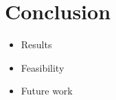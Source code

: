 \chapter{Conclusion} 

\begin{itemize}
\item Results
\item Feasibility
\item Future work
\end{itemize}